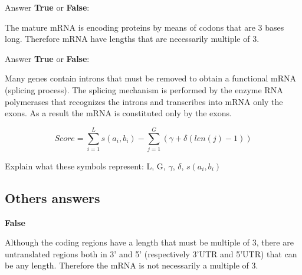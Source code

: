 \begin{Exercise} [
  title={mRNA},
  difficulty={1},
  label={ex20},
  origin={G. Valle}
 ]

Answer \textbf{True} or \textbf{False}:

  \Question The mature mRNA is encoding proteins by means of codons that are
3 bases long. Therefore mRNA have lengths that are necessarily multiple of 3.

\end{Exercise}

\begin{Exercise} [
  title={Splicing},
  difficulty={1},
  label={ex21},
  origin={G. Valle}
 ]

Answer \textbf{True} or \textbf{False}:

  \Question Many genes contain introns that must be removed to obtain a
functional mRNA (splicing process).
The splicing mechanism is performed by the enzyme RNA polymerases that
recognizes the introns and transcribes into mRNA only the exons.
As a result the mRNA is constituted only by the exons.

\end{Exercise}

\begin{Exercise} [
  title={Objective function for alignment},
  difficulty={1},
  label={ex22},
  origin={G. Valle}
 ]

\begin{equation}
Score = \sum_{i=1}^{L} s(a_i,b_i) - \sum_{j=1}^{G} (\gamma + \delta(len(j)-1))
\end{equation}

  \Question Explain what these symbols represent: L, G, $\gamma$, $\delta$,
$s(a_i,b_i)$

\end{Exercise}

\subsection{Others answers}

\begin{Answer} [
   ref={ex20},
   number={20}
 ]

  \Question \textbf{False}

Although the coding regions have a length that must be multiple of 3, there are untranslated regions both in 3' and 5' (respectively 3'UTR and 5'UTR) that can be any length. Therefore the mRNA is not necessarily a multiple of 3.

\end{Answer}

